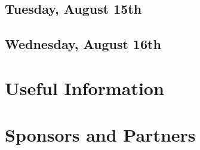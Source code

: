 \documentclass[openany, parskip=full, 12pt, a4]{scrbook}
\begin{document}






\section{Tuesday, August 15th}













\section{Wednesday, August 16th}










 
% 
 
\chapter{Useful Information}



\chapter{Sponsors and Partners}



\newpage


\pagecolor{myblue}
\thispagestyle{empty}
\mbox{}
\end{document}
